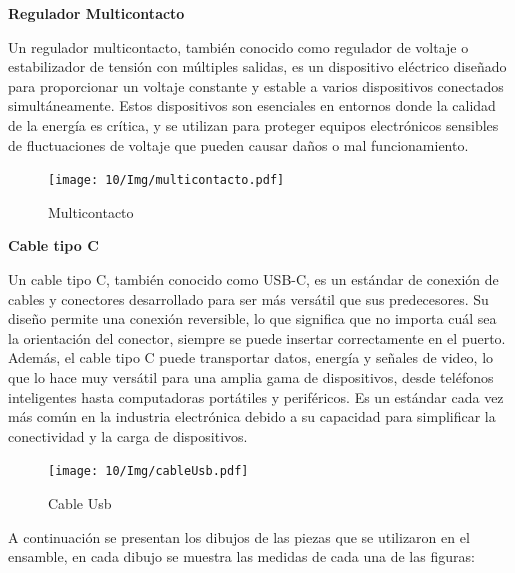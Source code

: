 \textbf{Regulador Multicontacto}

Un regulador multicontacto, también conocido como regulador de voltaje o estabilizador de tensión con múltiples salidas, es un dispositivo eléctrico diseñado para proporcionar un voltaje constante y estable a varios dispositivos conectados simultáneamente. Estos dispositivos son esenciales en entornos donde la calidad de la energía es crítica, y se utilizan para proteger equipos electrónicos sensibles de fluctuaciones de voltaje que pueden causar daños o mal funcionamiento.

 \begin{figure}[H]
        \centering
        \texttt{[image: 10/Img/multicontacto.pdf]}
        \caption{Multicontacto}
        \label{Multicontacto}
\end{figure}

\textbf{Cable tipo C}

Un cable tipo C, también conocido como USB-C, es un estándar de conexión de cables y conectores desarrollado para ser más versátil que sus predecesores. Su diseño permite una conexión reversible, lo que significa que no importa cuál sea la orientación del conector, siempre se puede insertar correctamente en el puerto. Además, el cable tipo C puede transportar datos, energía y señales de video, lo que lo hace muy versátil para una amplia gama de dispositivos, desde teléfonos inteligentes hasta computadoras portátiles y periféricos. Es un estándar cada vez más común en la industria electrónica debido a su capacidad para simplificar la conectividad y la carga de dispositivos.

\begin{figure}[H]
        \centering
        \texttt{[image: 10/Img/cableUsb.pdf]}
        \caption{Cable Usb}
        \label{Cable usb}
    \end{figure}
    
A continuación se presentan los dibujos de las
piezas que se utilizaron en el ensamble, en cada dibujo se muestra las medidas de cada una de las figuras:

